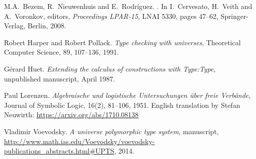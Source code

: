 \documentclass[11pt,a4paper]{article}
\begin{document}


\begin{thebibliography}{99}

M.A.~Bezem, R.~Nieuwenhuis and E.~Rodr\'iguez.
.
In I.~Cervesato, H.~Veith and A.~Voronkov, editors,
\emph{Proceedings LPAR-15}, LNAI 5330,
pages 47--62, Springer-Verlag, Berlin, 2008.

Robert Harper and Robert Pollack.
\newblock\emph{Type checking with universes},
Theoretical Computer Science, 89, 107--136, 1991.

G\'erard Huet.
\newblock\emph{Extending the calculus of constructions with {Type:Type}},
\newblock unpublished manuscript, April 1987.

Paul Lorenzen.
  \newblock\emph{Algebraische und logistische Untersuchungen über freie Verbände},
Journal of Symbolic Logic, 16(2), 81--106, 1951.
English translation by Stefan Neuwirth: \url{https://arxiv.org/abs/1710.08138}

  Vladimir Voevodsky.
 \newblock\emph{A universe polymorphic type system},
manuscript, 
 \newblock \url{http://www.math.ias.edu/Voevodsky/voevodsky-publications_abstracts.html\#UPTS}, {2014}.



\end{thebibliography}
\end{document}
